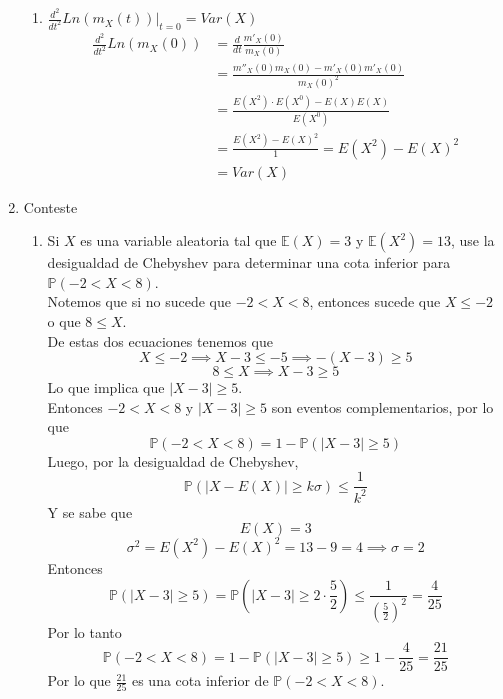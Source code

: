 \documentclass[12pt,a4paper]{report}
\begin{document}
\begin{enumerate}
{\begin{enumerate}
				\item {
				$\frac{d^2}{dt^2}Ln(m_X(t))|_{t = 0} = Var(X)$
				\begin{align*}
					\frac{d^2}{dt^2}Ln(m_X(0)) &= \frac{d}{dt}\frac{m'_X(0)}{m_X(0)}\\
					&= \frac{m''_X(0)m_X(0)-m'_X(0)m'_X(0)}{m_X(0)^2}\\
					&= \frac{E(X^2) \cdot E(X^0) - E(X)E(X)}{E(X^0)}\\
					&= \frac{E(X^2)-E(X)^2}{1} = E(X^2)-E(X)^2 \\
					&= Var(X)
				\end{align*}
				}
			\end{enumerate}
		}

		\item{
			Conteste
			\begin{enumerate}
				\item {
					Si $X$ es una variable aleatoria tal que
					$\mathbb{E}(X) = 3$ y $\mathbb{E}(X^2) = 13$, use la
					desigualdad de Chebyshev para determinar una cota inferior
					para $\mathbb{P}(-2 < X < 8)$.\\
					Notemos que si no sucede que $-2 < X < 8$, entonces  sucede que
					$X \leq -2$ o que $8 \leq X$.\\
					De estas dos ecuaciones tenemos que
					\[X \leq -2 \implies X - 3 \leq -5 \implies -(X - 3) \geq 5\]
					\[ 8 \leq X \implies X - 3 \geq 5\]
					Lo que implica que $|X-3| \geq 5$.\\
					Entonces $-2 < X < 8$ y $|X-3| \geq 5$ son eventos
					complementarios, por lo que
					\[\mathbb{P}(-2 < X < 8) = 1 - \mathbb{P}(|X-3| \geq 5)\]
					Luego, por la desigualdad de Chebyshev,
					\[\mathbb{P}(|X-E(X)| \geq k\sigma) \leq \frac{1}{k^2}\]
					Y se sabe que
					\[E(X) = 3\]
					\[\sigma ^2 = E(X^2) - E(X)^2 = 13 - 9 = 4 \implies \sigma = 2\]
					Entonces
					\[\mathbb{P}(|X-3| \geq 5) = \mathbb{P}(|X-3| \geq 2\cdot \frac{5}{2})
					 \leq \frac{1}{(\frac{5}{2})^2} = \frac{4}{25}\]
					Por lo tanto
					\[\mathbb{P}(-2 < X < 8) = 1 - \mathbb{P}(|X-3| \geq 5)
					\geq 1 - \frac{4}{25} = \frac{21}{25}\]
					Por lo que $\frac{21}{25}$ es una cota inferior de
					$\mathbb{P}(-2 < X < 8)$.
				}


\end{enumerate}}
\end{enumerate}
\end{document}
